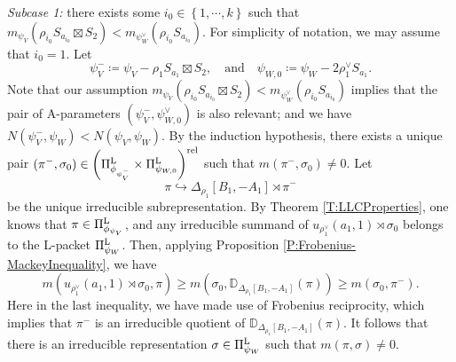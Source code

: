 \documentclass[11pt,letterpaper]{amsart}
\theoremstyle{plain}
\numberwithin{theorem}{section}
\numberwithin{equation}{subsection}
\theoremstyle{remark}
\newcommand{\D}{\mathbb{D}}
\def\LP{\Pi^{\rm L}} %
\def\rel{{\rm rel}} %
\begin{document}
\emph{Subcase 1:} there exists some $i_0\in\left\{1,\cdots,k\right\}$ such that $m_{\psi_V}\left(\rho_{i_0} S_{a_{i_0}}\boxtimes S_2\right) < m_{\psi_W^\vee}\left(\rho_{i_0} S_{a_{i_0}}\right)$. For simplicity of notation, we may assume that $i_0=1$. Let
\[
    \psi_V^- \coloneqq \psi_V - \rho_1 S_{a_1}\boxtimes S_2, \quad \text{and} \quad \psi_{W,0} \coloneqq \psi_W-2\rho_1^\vee S_{a_1}.
\]
Note that our assumption $m_{\psi_V}\left(\rho_{i_0} S_{a_{i_0}}\boxtimes S_2\right) < m_{\psi_W^\vee}\left(\rho_{i_0} S_{a_{i_0}}\right)$ implies that the pair of A-parameters $\left(\psi_V^-,\psi_{W,0}^\vee\right)$ is also relevant; and we have $N\left(\psi_V^-,\psi_W\right)<N\left(\psi_V,\psi_W\right)$. By the induction hypothesis, there exists a unique pair $\left(\pi^-,\sigma_0\right)\in\left(\LP_{\phi_{\psi_V^-}}\times\LP_{\psi_{W,0}}\right)^\rel$ such that $m\left(\pi^-,\sigma_0\right)\neq 0$. Let
\[
    \pi\hookrightarrow\Delta_{\rho_1}\left[B_1,-A_1\right]\rtimes\pi^-
\]
be the unique irreducible subrepresentation. By Theorem \ref{T:LLCProperties}, one knows that $\pi\in\LP_{\phi_{\psi_V}}$, and any irreducible summand of $u_{\rho_1^\vee}\left(a_1,1\right)\rtimes\sigma_0$ belongs to the L-packet $\LP_{\psi_W}$. Then, applying Proposition \ref{P:Frobenius-MackeyInequality}, we have
\[
    m\left(u_{\rho_1^\vee}\left(a_1,1\right)\rtimes\sigma_0,\pi\right)\geq m\left(\sigma_0,\D_{\Delta_{\rho_1}\left[B_1,-A_1\right]}\left(\pi\right)\right) \geq m\left(\sigma_0,\pi^-\right).
\]
Here in the last inequality, we have made use of Frobenius reciprocity, which implies that $\pi^-$ is an irreducible quotient of $\D_{\Delta_{\rho_1}\left[B_1,-A_1\right]}\left(\pi\right)$. It follows that there is an irreducible representation $\sigma\in\LP_{\psi_W}$ such that $m\left(\pi,\sigma\right)\neq 0$.

\vskip 5pt
\end{document}
